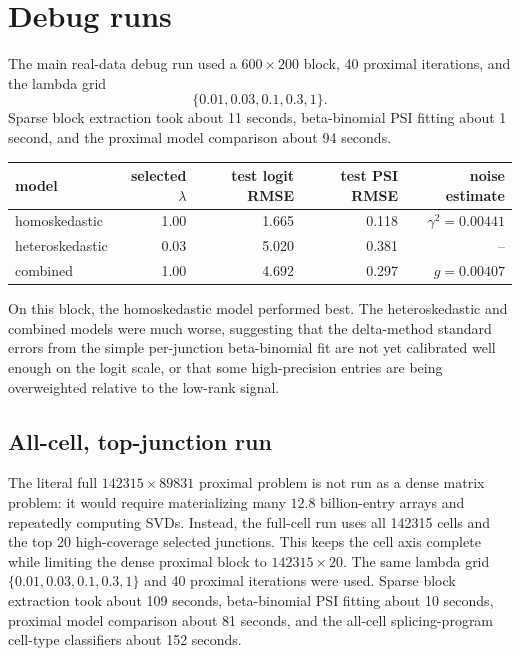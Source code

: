\documentclass[11pt]{article}
\begin{document}
\section{Debug runs}

The main real-data debug run used a \(600\times 200\) block, 40 proximal
iterations, and the lambda grid
\[
\{0.01,0.03,0.1,0.3,1\}.
\]
Sparse block extraction took about 11 seconds, beta-binomial PSI fitting about
1 second, and the proximal model comparison about 94 seconds.

\begin{center}
\begin{tabular}{lrrrr}
\toprule
model & selected \(\lambda\) & test logit RMSE & test PSI RMSE & noise estimate\\
\midrule
homoskedastic & 1.00 & 1.665 & 0.118 & \(\gamma^2=0.00441\)\\
heteroskedastic & 0.03 & 5.020 & 0.381 & --\\
combined & 1.00 & 4.692 & 0.297 & \(g=0.00407\)\\
\bottomrule
\end{tabular}
\end{center}

On this block, the homoskedastic model performed best.  The heteroskedastic and
combined models were much worse, suggesting that the delta-method standard
errors from the simple per-junction beta-binomial fit are not yet calibrated
well enough on the logit scale, or that some high-precision entries are being
overweighted relative to the low-rank signal.

\subsection{All-cell, top-junction run}

The literal full \(142315\times 89831\) proximal problem is not run as a dense
matrix problem: it would require materializing many \(12.8\) billion-entry
arrays and repeatedly computing SVDs.  Instead, the full-cell run uses all
142315 cells and the top 20 high-coverage selected junctions.  This keeps the
cell axis complete while limiting the dense proximal block to
\(142315\times 20\).  The same lambda grid
\(\{0.01,0.03,0.1,0.3,1\}\) and 40 proximal iterations were used.  Sparse block
extraction took about 109 seconds, beta-binomial PSI fitting about 10 seconds,
proximal model comparison about 81 seconds, and the all-cell splicing-program
cell-type classifiers about 152 seconds.
\end{document}
